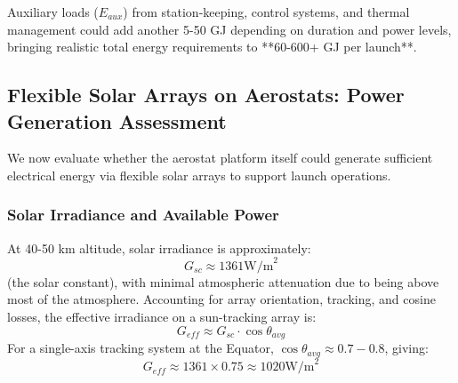 Auxiliary loads ($E_{aux}$) from station-keeping, control systems, and thermal management could add another 5-50 GJ depending on duration and power levels, bringing realistic total energy requirements to **60-600+ GJ per launch**.

\subsection{Flexible Solar Arrays on Aerostats: Power Generation Assessment}
We now evaluate whether the aerostat platform itself could generate sufficient electrical energy via flexible solar arrays to support launch operations.

\subsubsection{Solar Irradiance and Available Power}
At 40-50 km altitude, solar irradiance is approximately:
\begin{equation}
G_{sc} \approx 1361  \text{W/m}^2
\end{equation}
(the solar constant), with minimal atmospheric attenuation due to being above most of the atmosphere. Accounting for array orientation, tracking, and cosine losses, the effective irradiance on a sun-tracking array is:
\begin{equation}
G_{eff} \approx G_{sc} \cdot \cos\theta_{avg}
\end{equation}
For a single-axis tracking system at the Equator, $\cos\theta_{avg} \approx 0.7-0.8$, giving:
\begin{equation}
G_{eff} \approx 1361 \times 0.75 \approx 1020  \text{W/m}^2
\end{equation}

